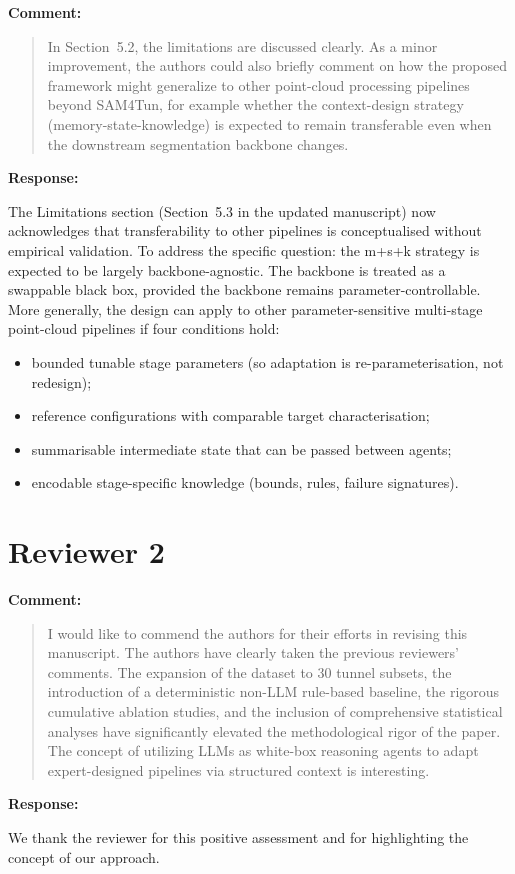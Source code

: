 \documentclass[11pt,a4paper]{article}
\newenvironment{commentblock}{%
  \par\smallskip\noindent\textbf{Comment:}\par
  \begin{quote}\itshape\color{black}
}{%
  \end{quote}\smallskip
}
\newenvironment{responseblock}{%
  \par\smallskip\noindent\textbf{Response:}\par
  \begingroup\color{responsegreen}
}{%
  \endgroup\smallskip
}
\begin{document}
\begin{commentblock}
In Section~5.2, the limitations are discussed clearly. As a minor improvement, the authors could also briefly comment on how the proposed framework might generalize to other point-cloud processing pipelines beyond SAM4Tun, for example whether the context-design strategy (memory-state-knowledge) is expected to remain transferable even when the downstream segmentation backbone changes.
\end{commentblock}
\begin{responseblock}
The Limitations section (Section~5.3 in the updated manuscript) now acknowledges that transferability to other pipelines is conceptualised without empirical validation. To address the specific question: the m+s+k strategy is expected to be largely backbone-agnostic. The backbone is treated as a swappable black box, provided the backbone remains parameter-controllable.
More generally, the design can apply to other parameter-sensitive multi-stage point-cloud pipelines if four conditions hold:
\begin{itemize}[nosep]
  \item bounded tunable stage parameters (so adaptation is re-parameterisation, not redesign);
  \item reference configurations with comparable target characterisation;
  \item summarisable intermediate state that can be passed between agents;
  \item encodable stage-specific knowledge (bounds, rules, failure signatures).
\end{itemize}
\end{responseblock}

\section*{Reviewer 2}

\begin{commentblock}
I would like to commend the authors for their efforts in revising this manuscript. The authors have clearly taken the previous reviewers' comments. The expansion of the dataset to 30 tunnel subsets, the introduction of a deterministic non-LLM rule-based baseline, the rigorous cumulative ablation studies, and the inclusion of comprehensive statistical analyses have significantly elevated the methodological rigor of the paper. The concept of utilizing LLMs as white-box reasoning agents to adapt expert-designed pipelines via structured context is interesting.
\end{commentblock}
\begin{responseblock}
We thank the reviewer for this positive assessment and for highlighting the concept of our approach.
\end{responseblock}
\end{document}
